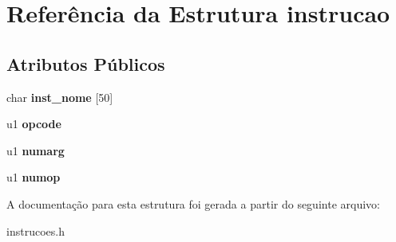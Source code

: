 \hypertarget{structinstrucao}{}\section{Referência da Estrutura instrucao}
\label{structinstrucao}
\subsection*{Atributos Públicos}
\begin{DoxyCompactItemize}
\item 
\mbox{\label{structinstrucao_a848f2424a95f3d71ded0327a524446b8}} 
char {\bfseries inst\+\_\+nome} \mbox{[}50\mbox{]}
\item 
\mbox{\label{structinstrucao_a6fab1343e02c9298bc65ce60976e41a0}} 
u1 {\bfseries opcode}
\item 
\mbox{\label{structinstrucao_a59c5e317639fc03517361dd90678d239}} 
u1 {\bfseries numarg}
\item 
\mbox{\label{structinstrucao_ae1e28e385eb8ef40eba3918cd8f458d0}} 
u1 {\bfseries numop}
\end{DoxyCompactItemize}


A documentação para esta estrutura foi gerada a partir do seguinte arquivo\+:\begin{DoxyCompactItemize}
\item 
instrucoes.\+h\end{DoxyCompactItemize}
